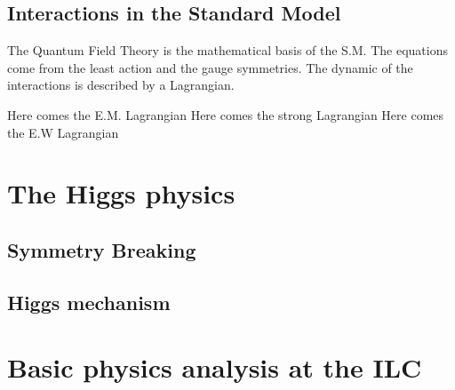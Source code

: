     \subsection{Interactions in the Standard Model}

    The Quantum Field Theory is the mathematical basis of the S.M.
    The equations come from the least action and the gauge symmetries. 
    The dynamic of the interactions is described by a Lagrangian.

    Here comes the E.M. Lagrangian
    Here comes the strong Lagrangian
    Here comes the E.W Lagrangian

  \section{The Higgs physics}

    \subsection{Symmetry Breaking}

    \subsection{Higgs mechanism}

  \section{Basic physics analysis at the ILC}
